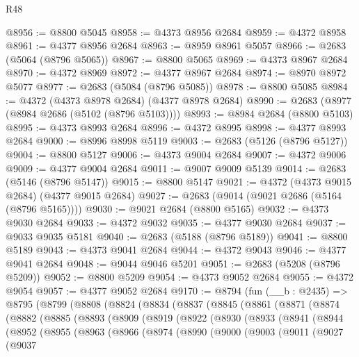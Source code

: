 \begin{lexlean}{R48}
\begin{coremodule}
@8956 := @8800 @5045
@8958 := @4373 @8956 @2684
@8959 := @4372 @8958
@8961 := @4377 @8956 @2684
@8963 := @8959 @8961 @5057
@8966 := @2683 (@5064 (@8796 @5065))
@8967 := @8800 @5065
@8969 := @4373 @8967 @2684
@8970 := @4372 @8969
@8972 := @4377 @8967 @2684
@8974 := @8970 @8972 @5077
@8977 := @2683 (@5084 (@8796 @5085))
@8978 := @8800 @5085
@8984 := @4372 (@4373 @8978 @2684) (@4377 @8978 @2684)
@8990 := @2683 (@8977 (@8984 @2686 (@5102 (@8796 @5103))))
@8993 := @8984 @2684 (@8800 @5103)
@8995 := @4373 @8993 @2684
@8996 := @4372 @8995
@8998 := @4377 @8993 @2684
@9000 := @8996 @8998 @5119
@9003 := @2683 (@5126 (@8796 @5127))
@9004 := @8800 @5127
@9006 := @4373 @9004 @2684
@9007 := @4372 @9006
@9009 := @4377 @9004 @2684
@9011 := @9007 @9009 @5139
@9014 := @2683 (@5146 (@8796 @5147))
@9015 := @8800 @5147
@9021 := @4372 (@4373 @9015 @2684) (@4377 @9015 @2684)
@9027 := @2683 (@9014 (@9021 @2686 (@5164 (@8796 @5165))))
@9030 := @9021 @2684 (@8800 @5165)
@9032 := @4373 @9030 @2684
@9033 := @4372 @9032
@9035 := @4377 @9030 @2684
@9037 := @9033 @9035 @5181
@9040 := @2683 (@5188 (@8796 @5189))
@9041 := @8800 @5189
@9043 := @4373 @9041 @2684
@9044 := @4372 @9043
@9046 := @4377 @9041 @2684
@9048 := @9044 @9046 @5201
@9051 := @2683 (@5208 (@8796 @5209))
@9052 := @8800 @5209
@9054 := @4373 @9052 @2684
@9055 := @4372 @9054
@9057 := @4377 @9052 @2684
@9170 := @8794
    (fun (__b : @2435) =>
    @8795
      (@8799
        (@8808
          (@8824
            (@8834
              (@8837
                (@8845
                  (@8861
                    (@8871
                      (@8874
                        (@8882
                          (@8885
                            (@8893
                              (@8909
                                (@8919
                                  (@8922
                                    (@8930
                                      (@8933
                                        (@8941
                                          (@8944
                                            (@8952
                                              (@8955
                                                (@8963
                                                  (@8966
                                                    (@8974
                                                      (@8990
                                                        (@9000
                                                          (@9003
                                                            (@9011
                                                              (@9027
                                                                (@9037

\end{coremodule}
\end{lexlean}

